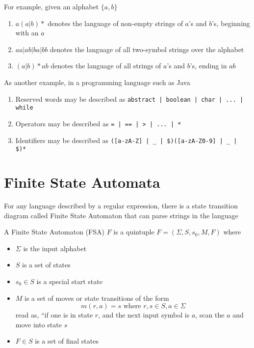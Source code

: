 \documentclass[8pt,a4paper,compress]{beamer}
\begin{document}
\begin{frame}[fragile]
\pause

For example, given an alphabet $\{a,b\}$

\begin{enumerate}
\item $a(a|b)*$ denotes the language of non-empty strings of $a$'s and $b$'s, beginning with an $a$
\item $aa | ab | ba | bb$ denotes the language of all two-symbol strings over the alphabet
\item $(a|b)\!*\!ab$ denotes the language of all strings of $a$'s and $b$'s, ending in $ab$
\end{enumerate}

\pause
\bigskip

As another example, in a programming language such as Java
\begin{enumerate}
\item Reserved words may be described as \lstinline{abstract | boolean | char | ... | while}

\item Operators may be described as \lstinline{= | == | > | ... | *}

\item Identifiers may be described as \lstinline{([a-zA-Z] | _ | $)([a-zA-Z0-9] | _ | $)*}
\end{enumerate}
\end{frame}

\section{Finite State Automata}
\begin{frame}[fragile]
\pause

For any language described by a regular expression, there is a state transition diagram called Finite State Automaton that can parse strings in the language

\pause
\bigskip

A Finite State Automaton (FSA) $F$ is a quintuple $F = (\Sigma, S, s_0, M, F)$ where
\begin{itemize}
\item $\Sigma$ is the input alphabet
\item $S$ is a set of states
\item $s_0 \in S$ is a special start state
\item $M$ is a set of moves or state transitions of the form $$m(r, a) = s \text{ where } r,s \in S, a \in \Sigma$$ read as, ``if one is in state $r$, and the next input symbol is $a$, scan the $a$ and move into state $s$
\item $F \in S$ is a set of final states
\end{itemize}
\end{frame}
\end{document}
